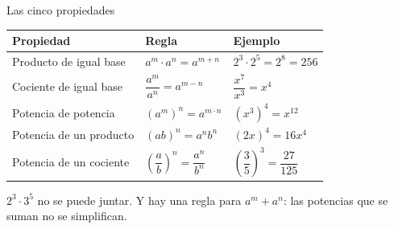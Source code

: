 \documentclass[aspectratio=169,10pt]{beamer}
\begin{document}
\begin{frame}{Las cinco propiedades}
  \scriptsize
  \begin{center}
  \begin{tabular}{@{}p{4.0cm}p{4.0cm}p{4.0cm}@{}}
    \toprule
    \textbf{Propiedad} & \textbf{Regla} & \textbf{Ejemplo} \\
    \midrule
    Producto de igual base &
      $a^{m}\cdot a^{n} = a^{m+n}$ &
      $2^{3}\cdot 2^{5} = 2^{8} = 256$ \\
    \addlinespace
    Cociente de igual base &
      $\dfrac{a^{m}}{a^{n}} = a^{m-n}$ &
      $\dfrac{x^{7}}{x^{3}} = x^{4}$ \\
    \addlinespace
    Potencia de potencia &
      $(a^{m})^{n} = a^{m\cdot n}$ &
      $(x^{3})^{4} = x^{12}$ \\
    \addlinespace
    Potencia de un producto &
      $(ab)^{n} = a^{n}b^{n}$ &
      $(2x)^{4} = 16x^{4}$ \\
    \addlinespace
    Potencia de un cociente &
      $\left(\dfrac{a}{b}\right)^{n} = \dfrac{a^{n}}{b^{n}}$ &
      $\left(\dfrac{3}{5}\right)^{3} = \dfrac{27}{125}$ \\
    \bottomrule
  \end{tabular}
  \end{center}

  \vspace{0.06cm}
  {\tiny\color{uniGris} 
  $2^{3}\cdot 3^{5}$ no se puede juntar. Y  hay una regla para
  $a^{m}+a^{n}$: las potencias que se suman no se simplifican.}
\end{frame}
\end{document}
